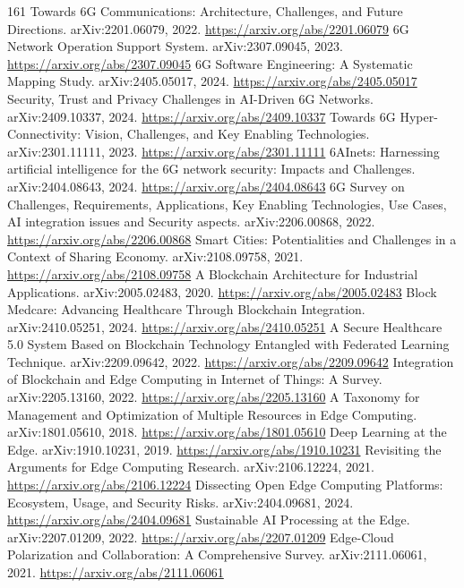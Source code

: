 \documentclass[11pt]{article}
\begin{document}
\begin{thebibliography}{161}
 Towards 6G Communications: Architecture, Challenges, and Future Directions. arXiv:2201.06079, 2022. \url{https://arxiv.org/abs/2201.06079}
 6G Network Operation Support System. arXiv:2307.09045, 2023. \url{https://arxiv.org/abs/2307.09045}
 6G Software Engineering: A Systematic Mapping Study. arXiv:2405.05017, 2024. \url{https://arxiv.org/abs/2405.05017}
 Security, Trust and Privacy Challenges in AI-Driven 6G Networks. arXiv:2409.10337, 2024. \url{https://arxiv.org/abs/2409.10337}
 Towards 6G Hyper-Connectivity: Vision, Challenges, and Key Enabling Technologies. arXiv:2301.11111, 2023. \url{https://arxiv.org/abs/2301.11111}
 6AInets: Harnessing artificial intelligence for the 6G network security: Impacts and Challenges. arXiv:2404.08643, 2024. \url{https://arxiv.org/abs/2404.08643}
 6G Survey on Challenges, Requirements, Applications, Key Enabling Technologies, Use Cases, AI integration issues and Security aspects. arXiv:2206.00868, 2022. \url{https://arxiv.org/abs/2206.00868}
 Smart Cities: Potentialities and Challenges in a Context of Sharing Economy. arXiv:2108.09758, 2021. \url{https://arxiv.org/abs/2108.09758}
 A Blockchain Architecture for Industrial Applications. arXiv:2005.02483, 2020. \url{https://arxiv.org/abs/2005.02483}
 Block Medcare: Advancing Healthcare Through Blockchain Integration. arXiv:2410.05251, 2024. \url{https://arxiv.org/abs/2410.05251}
 A Secure Healthcare 5.0 System Based on Blockchain Technology Entangled with Federated Learning Technique. arXiv:2209.09642, 2022. \url{https://arxiv.org/abs/2209.09642}
 Integration of Blockchain and Edge Computing in Internet of Things: A Survey. arXiv:2205.13160, 2022. \url{https://arxiv.org/abs/2205.13160}
 A Taxonomy for Management and Optimization of Multiple Resources in Edge Computing. arXiv:1801.05610, 2018. \url{https://arxiv.org/abs/1801.05610}
 Deep Learning at the Edge. arXiv:1910.10231, 2019. \url{https://arxiv.org/abs/1910.10231}
 Revisiting the Arguments for Edge Computing Research. arXiv:2106.12224, 2021. \url{https://arxiv.org/abs/2106.12224}
 Dissecting Open Edge Computing Platforms: Ecosystem, Usage, and Security Risks. arXiv:2404.09681, 2024. \url{https://arxiv.org/abs/2404.09681}
 Sustainable AI Processing at the Edge. arXiv:2207.01209, 2022. \url{https://arxiv.org/abs/2207.01209}
 Edge-Cloud Polarization and Collaboration: A Comprehensive Survey. arXiv:2111.06061, 2021. \url{https://arxiv.org/abs/2111.06061}

\end{thebibliography}
\end{document}
